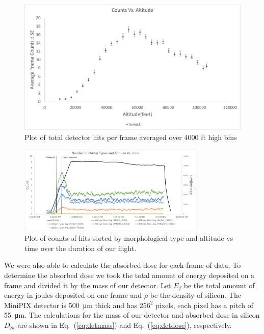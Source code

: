 \begin{figure}[h!]
\begin{center}
\includegraphics[width=.9\textwidth]{./Figures/countstderr.pdf}
\caption{Plot of total detector hits per frame averaged over 4000 ft high bins}
\label{fig:hits2}
\end{center}
\end{figure}

\begin{figure}[h!]
\begin{center}
\includegraphics[width=0.8\textwidth]{./Figures/typesandaltitudevtime.pdf}
\caption{Plot of counts of hits sorted by morphological type and altitude vs time over the duration of our flight.}
\label{fig:clustersplot}
\end{center}
\end{figure}


We were also able to calculate the absorbed dose for each frame of data. To determine the absorbed dose we took the total amount of energy deposited on a frame and divided it by the mass of our detector. Let $E_{f}$ be the total amount of energy in joules deposited on one frame and $\rho$ be the density of silicon. The MiniPIX detector is \SI{500}{\micro\meter} thick and has $256^2$ pixels, each pixel has a pitch of \SI{55}{\micro\meter}. The calculations for the mass of our detector and absorbed dose in silicon $D_{Si}$ are shown in Eq.~(\ref{eq:detmass}) and Eq.~(\ref{eq:detdose}), respectively.

